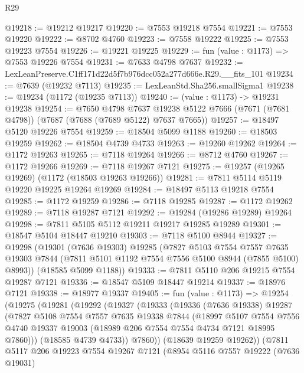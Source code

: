 \begin{lexlean}{R29}
\begin{coremodule}
@19218 := @19212 @19217
@19220 := @7553 @19218 @7554
@19221 := @7553 @19220
@19222 := @8702 @4760
@19223 := @7558 @19222
@19225 := @7553 @19223 @7554
@19226 := @19221 @19225
@19229 := fun (value : @1173) => @7553 @19226 @7554
@19231 := @7633 @4798 @7637
@19232 := LexLeanPreserve.C1ff171d22d5f7b976dcc052a277d666e.R29.__fits_101
@19234 := @7639 (@19232 @7113)
@19235 := LexLeanStd.Sha256.smallSigma1
@19238 := @19234 (@1172 (@19235 @7113))
@19240 := (value : @1173) -> @19231 @19238
@19254 := @7650
    @4798
    @7637
    @19238
    @5122
    @7666
    (@7671 (@7681 @4798))
    (@7687 (@7688 (@7689 @5122) @7637 @7665))
@19257 := @18497 @5120 @19226 @7554
@19259 := @18504 @5099 @1188
@19260 := @18503 @19259
@19262 := @18504 @4739 @4733
@19263 := @19260 @19262
@19264 := @1172 @19263
@19265 := @7118 @19264
@19266 := @8712 @4760
@19267 := @1172 @19266
@19269 := @7118 @19267 @7121
@19275 := @19257 (@19265 @19269) (@1172 (@18503 @19263 @19266))
@19281 := @7811 @5114 @5119 @19220 @19225 @19264 @19269
@19284 := @18497 @5113 @19218 @7554
@19285 := @1172 @19259
@19286 := @7118 @19285
@19287 := @1172 @19262
@19289 := @7118 @19287 @7121
@19292 := @19284 (@19286 @19289) @19264
@19298 := @7811 @5105 @5112 @19211 @19217 @19285 @19289
@19301 := @18547 @5104 @18447 @19210
@19303 := @7118 @5100 @8944
@19327 := @19298
    (@19301
      (@7636 @19303)
      @19285
      (@7827
        @5103
        @7554
        @7557
        @7635
        @19303
        @7844
        (@7811 @5101 @1192 @7554 @7556 @5100 @8944 (@7855 @5100) @8993))
      (@18585 @5099 @1188))
@19333 := @7811 @5110 @206 @19215 @7554 @19287 @7121
@19336 := @18547 @5109 @18447 @19214
@19337 := @18976 @7121
@19338 := @18977 @19337
@19405 := fun (value : @1173) =>
  @19254
    (@19275
      (@19281
        (@19292
          (@19327
            (@19333
              (@19336
                (@7636 @19338)
                @19287
                (@7827
                  @5108
                  @7554
                  @7557
                  @7635
                  @19338
                  @7844
                  (@18997
                    @5107
                    @7554
                    @7556
                    @4740
                    @19337
                    @19003
                    (@18989 @206 @7554 @7554 @4734 @7121 @18995 @7860)))
                (@18585 @4739 @4733))
              @7860))
          (@18639 @19259 @19262))
        (@7811
          @5117
          @206
          @19223
          @7554
          @19267
          @7121
          (@8954
            @5116
            @7557
            @19222
            (@7636 @19031)

\end{coremodule}
\end{lexlean}
